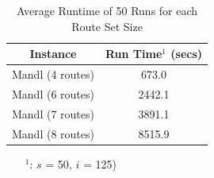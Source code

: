\begin{table}[H]
    \centering
    \hspace*{-1.0cm}
    \begin{tabular}{|c|c|}
        \hline
        \textbf{Instance} & \textbf{Run Time$^1$ (secs)}\\
        \hline
        Mandl (4 routes) & 673.0\\
        \hline
        Mandl (6 routes) & 2442.1\\
        \hline
        Mandl (7 routes) & 3891.1\\
        \hline
        Mandl (8 routes) & 8515.9\\
        \hline
    \end{tabular}
    \caption{Average Runtime of 50 Runs for each Route Set Size}
    \begin{itemize}[noitemsep]
    \item[$^1$:] $s$ = 50, $i$ = 125)
    \end{itemize} 
    \label{tabel:runTimeMandl}
\end{table}


